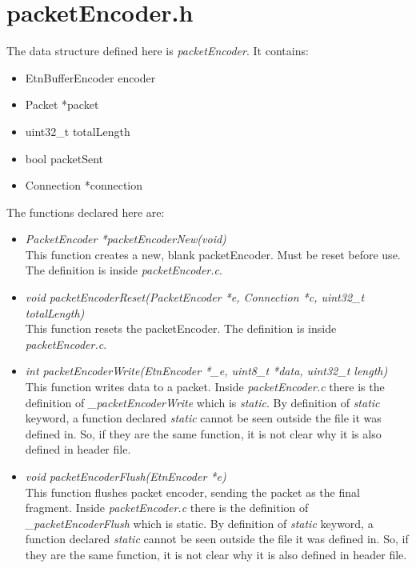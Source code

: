 \section{packetEncoder.h}
The data structure defined here is \emph{packetEncoder}. It contains:

\begin{itemize}
\item EtnBufferEncoder encoder
\item Packet  *packet
\item uint32\_t totalLength
\item bool packetSent
\item Connection *connection
\end{itemize}
The functions declared here are:

\begin{itemize}

\item\emph{PacketEncoder *packetEncoderNew(void)}\\
This function creates a new, blank packetEncoder. Must be reset before use. The definition is inside \emph{packetEncoder.c}.

\item\emph{void packetEncoderReset(PacketEncoder *e, Connection *c, uint32\_t totalLength)}\\
This function resets the packetEncoder. The definition is inside \emph{packetEncoder.c}.

\item\emph{int packetEncoderWrite(EtnEncoder *\_e, uint8\_t *data, uint32\_t length)}\\
This function writes data to a packet. Inside \emph{packetEncoder.c} there is the definition of \emph{\_packetEncoderWrite} which is \emph{static}. By definition of \emph{static} keyword, a function declared \emph{static} cannot be seen outside the file it was defined in. So, if they are the same function, it is not clear why it is also defined in header file.

\item\emph{void packetEncoderFlush(EtnEncoder *e)}\\
This function flushes packet encoder, sending the packet as the final fragment. Inside \emph{packetEncoder.c} there is the definition of \emph{\_packetEncoderFlush} which is static. By definition of \emph{static} keyword, a function declared \emph{static} cannot be seen outside the file it was defined in. So, if they are the same function, it is not clear why it is also defined in header file.

\end{itemize}